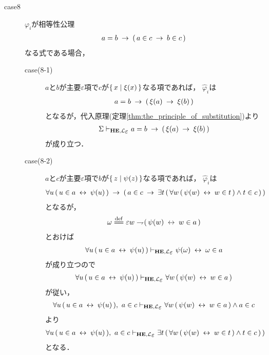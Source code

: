 \begin{metaprf}
\begin{description}
			\item[case8] $\varphi_{i}$が相等性公理
				\begin{align}
					a = b \hspace{0.25em}\rightarrow\hspace{0.25em} (\, a \in c \hspace{0.25em}\rightarrow\hspace{0.25em} b \in c\, )
				\end{align}
				なる式である場合，
				\begin{description}
					\item[case(8-1)] $a$と$b$が主要$\varepsilon$項で$c$が$\{\, x \mid \xi(x)\, \}$なる項であれば，
						$\widehat{\varphi}_{i}$は
						\begin{align}
							a = b \hspace{0.25em}\rightarrow\hspace{0.25em} (\, \xi(a) \hspace{0.25em}\rightarrow\hspace{0.25em} \xi(b)\, )
						\end{align}
						となるが，代入原理(定理\ref{thm:the_principle_of_substitution})より
						\begin{align}
							\Sigma \provable{\mbox{{\bf HE}},\lang{\varepsilon}} a = b \rarrow (\, \xi(a) \rarrow \xi(b)\, )
						\end{align}
						が成り立つ．
						
					\item[case(8-2)] $a$と$c$が主要$\varepsilon$項で$b$が$\{\, z \mid \psi(z)\, \}$なる項であれば，
						$\widehat{\varphi}_{i}$は
						\begin{align}
							\forall u\, (\, u \in a \hspace{0.25em}\leftrightarrow\hspace{0.25em} \psi(u)\, ) 
							\hspace{0.25em}\rightarrow\hspace{0.25em} (\, a \in c 
							\hspace{0.25em}\rightarrow\hspace{0.25em} \exists t\, (\, \forall w\, (\, \psi(w) \hspace{0.25em}\leftrightarrow\hspace{0.25em} w \in t\, ) \wedge t \in c\, )\, )
						\end{align}
						となるが，
						\begin{align}
							\omega \defeq \varepsilon w \negation (\, \psi(w) \lrarrow w \in a\, )
						\end{align}
						とおけば
						\begin{align}
							\forall u\, (\, u \in a \lrarrow \psi(u)\, )
							\provable{\mbox{{\bf HE}},\lang{\varepsilon}} \psi(\omega) \lrarrow \omega \in a 
						\end{align}
						が成り立つので
						\begin{align}
							\forall u\, (\, u \in a \lrarrow \psi(u)\, )
							\provable{\mbox{{\bf HE}},\lang{\varepsilon}} \forall w\, (\, \psi(w) \lrarrow w \in a\, )
						\end{align}
						が従い，
						\begin{align}
							\forall u\, (\, u \in a \lrarrow \psi(u)\, ),\ a \in c
							\provable{\mbox{{\bf HE}},\lang{\varepsilon}} \forall w\, (\, \psi(w) \lrarrow w \in a\, ) \wedge a \in c
						\end{align}
						より
						\begin{align}
							\forall u\, (\, u \in a \lrarrow \psi(u)\, ),\ a \in c
							\provable{\mbox{{\bf HE}},\lang{\varepsilon}} \exists t\, (\, \forall w\, (\, \psi(w) \lrarrow w \in t\, ) \wedge t \in c\, )\, )
						\end{align}
						となる．
						

\end{description}
\end{description}
\end{metaprf}
